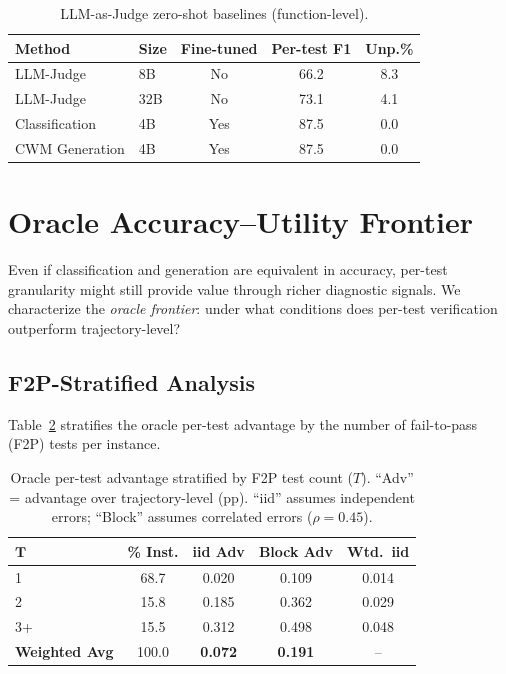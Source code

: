 \documentclass[11pt,a4paper]{article}
\begin{document}
\begin{table}[t]
\centering
\small
\caption{LLM-as-Judge zero-shot baselines (function-level).}
\label{tab:llmjudge}
\begin{tabular}{llccc}
\toprule
\textbf{Method} & \textbf{Size} & \textbf{Fine-tuned} & \textbf{Per-test F1} & \textbf{Unp.\%} \\
\midrule
LLM-Judge & 8B & No & 66.2 & 8.3 \\
LLM-Judge & 32B & No & 73.1 & 4.1 \\
Classification & 4B & Yes & 87.5 & 0.0 \\
CWM Generation & 4B & Yes & 87.5 & 0.0 \\
\bottomrule
\end{tabular}
\end{table}

\section{Oracle Accuracy--Utility Frontier}
\label{sec:frontier}

Even if classification and generation are equivalent in accuracy, per-test granularity might still provide value through richer diagnostic signals.
We characterize the \emph{oracle frontier}: under what conditions does per-test verification outperform trajectory-level?

\subsection{F2P-Stratified Analysis}

Table~\ref{tab:oracle} stratifies the oracle per-test advantage by the number of fail-to-pass (F2P) tests per instance.

\begin{table}[t]
\centering
\small
\caption{Oracle per-test advantage stratified by F2P test count ($T$). ``Adv'' = advantage over trajectory-level (pp). ``iid'' assumes independent errors; ``Block'' assumes correlated errors ($\rho{=}0.45$).}
\label{tab:oracle}
\begin{tabular}{lcccc}
\toprule
$\boldsymbol{T}$ & \textbf{\% Inst.} & \textbf{iid Adv} & \textbf{Block Adv} & \textbf{Wtd.\ iid} \\
\midrule
1 & 68.7 & 0.020 & 0.109 & 0.014 \\
2 & 15.8 & 0.185 & 0.362 & 0.029 \\
3+ & 15.5 & 0.312 & 0.498 & 0.048 \\
\midrule
\textbf{Weighted Avg} & 100.0 & \textbf{0.072} & \textbf{0.191} & -- \\
\bottomrule
\end{tabular}
\end{table}
\end{document}
